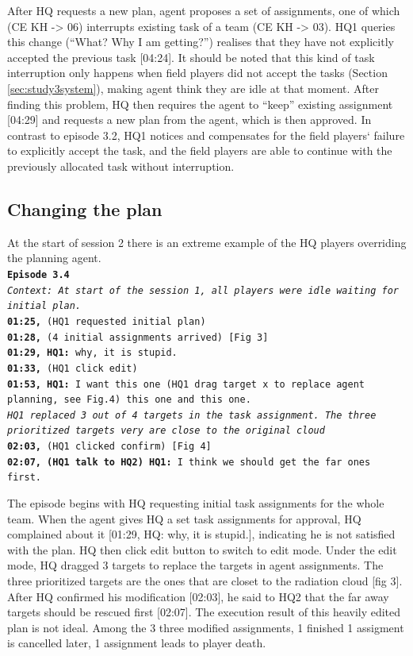 After HQ requests a new plan, agent proposes a set of assignments, one of which (CE KH -> 06) interrupts existing task of a team (CE KH -> 03). HQ1 queries this change (``What? Why I am getting?'') realises that they have not explicitly accepted the previous task [04:24]. It should be noted that this kind of task interruption only happens when field players did not accept the tasks (Section \ref{sec:study3system}), making agent think they are idle at that moment. After finding this problem, HQ then requires the agent to ``keep'' existing assignment [04:29] and requests a new plan from the agent, which is then approved. In contrast to episode 3.2, HQ1 notices and compensates for the field players` failure to explicitly accept the task, and the field players are able to continue with the previously allocated task without interruption.\\

\subsection{Changing the plan}
At the start of session 2 there is an extreme example of the HQ players overriding the planning agent. \\

\noindent\texttt{\textbf{Episode 3.4}\\
\emph{Context: At start of the session 1, all players were idle waiting for initial plan.}\\
\textbf{01:25,} (HQ1 requested initial plan)\\
\textbf{01:28,} (4 initial assignments arrived) [Fig 3] \\
\textbf{01:29, HQ1:}  why, it is stupid. \\
\textbf{01:33,} (HQ1 click edit)\\
\textbf{01:53, HQ1:} I want this one (HQ1 drag target x to replace agent planning, see Fig.4) this one and this one.\\
\emph{HQ1 replaced 3 out of 4 targets in the task assignment. The three prioritized targets very are close to the original cloud}\\
\textbf{02:03,} (HQ1 clicked confirm) [Fig 4]\\
\textbf{02:07, (HQ1 talk to HQ2) HQ1:} I think we should get the far ones first. \\
}

The episode begins with HQ requesting initial task assignments for the whole team. When the agent gives HQ  a set task assignments for approval, HQ complained about it [01:29, HQ: why, it is stupid.], indicating he is not satisfied with the plan. HQ then click edit button to switch to edit mode. Under the edit mode, HQ dragged 3 targets to replace the targets in agent assignments. The three prioritized targets are the ones that are closet to the radiation cloud [fig 3]. After HQ confirmed his modification [02:03], he said to HQ2 that the far away targets should be rescued first [02:07]. The execution result of this heavily edited plan is not ideal. Among the 3 three modified assignments, 1 finished 1 assigment is cancelled later, 1 assignment leads to player death.\\

